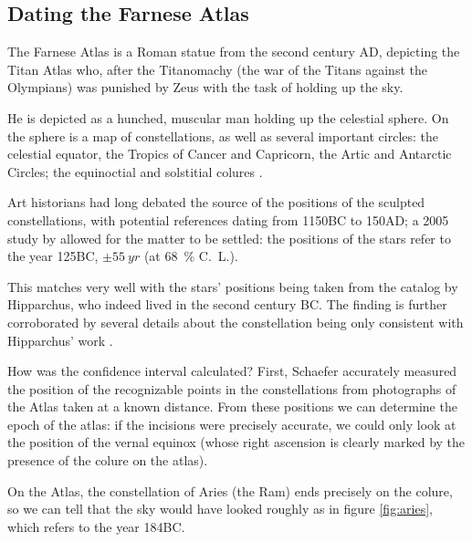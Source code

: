 \documentclass[main.tex]{subfiles}
\begin{document}
\subsection{Dating the Farnese Atlas}

The Farnese Atlas is a Roman statue from the second century AD, depicting the Titan Atlas who, after the Titanomachy (the war of the Titans against the Olympians) was punished by Zeus with the task of holding up the sky.

He is depicted as a hunched, muscular man holding up the celestial sphere. On the sphere is a map of constellations, as well as several important circles: the celestial equator, the Tropics of Cancer and Capricorn, the Artic and Antarctic Circles; the equinoctial and solstitial colures \cite[table 4]{schaeferEpochConstellationsFarnese2005}. 

Art historians had long debated the source of the positions of the sculpted constellations, with potential references dating from 1150BC to 150AD; a 2005 study by \textcite[]{schaeferEpochConstellationsFarnese2005} allowed for the matter to be settled: the positions of the stars refer to the year 125BC, \(\pm \SI{55}{yr}\) (at \SI{68}{\percent} C.\ L.).

This matches very well with the stars' positions being taken from the catalog by Hipparchus, who indeed lived in the second century BC. 
The finding is further corroborated by several details about the constellation being only consistent with Hipparchus' work \cite[sec.\ 2]{schaeferEpochConstellationsFarnese2005}.

How was the confidence interval calculated? First, Schaefer accurately measured the position of the recognizable points in the constellations from photographs of the Atlas taken at a known distance.
From these positions we can determine the epoch of the atlas: if the incisions were precisely accurate, we could only look at the position of the vernal equinox (whose right ascension is clearly marked by the presence of the colure on the atlas).

On the Atlas, the constellation of Aries (the Ram) ends precisely on the colure, so we can tell that the sky would have looked roughly as in figure \ref{fig:aries}, which refers to the year 184BC. 

\end{document}
